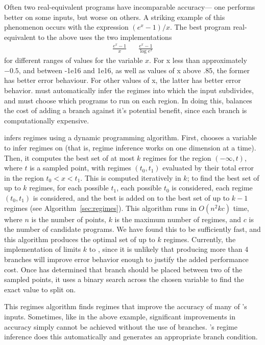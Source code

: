 \documentclass[paper.tex]{subfiles}
\begin{document}
Often two real-equivalent programs have incomparable accuracy---%
  one performs better on some inputs, but worse on others.
A striking example of this phenomenon occurs with the expression $(e^x - 1) / x$.
The best program real-equivalent to the above
  uses the two implementations
\begin{align*}
  \frac{e^x - 1}{x} && \frac{e^x - 1}{\log e^x}
\end{align*}
  for different ranges of values for the variable $x$.
For x less than approximately $-0.5$, 
  and between -1e16 and 1e16,
  as well as values of x above .85,
  the former has better error behaviour.
For other values of x,
  the latter has better error behavior.
\casio must automatically infer the regimes
  into which the input subdivides,
  and must choose which programs to run on each region.
In doing this, \casio balances the cost of adding a branch
  against it's potential benefit,
  since each branch is computationally expensive.

\casio infers regimes using a dynamic programming algorithm.
First, \casio chooses a variable to infer regimes on
  (that is, regime inference works on one dimension at a time).
Then, it computes the best set of at most $k$ regimes
  for the region $(-\infty, t)$, where $t$ is a sampled point,
  with regimes $(t_0, t_1)$ evaluated by their total error
  in the region $t_0 < x < t_1$.
This is computed iteratively in $k$;
  to find the best set of up to $k$ regimes,
  for each possible $t_1$, each possible $t_0$ is considered,
  each regime $(t_0, t_1)$ is considered,
  and the best is added on to the best set of up to $k-1$ regimes
  (see Algorithm~\ref{sec:regimes}).
This algorithm runs in $O(n^2 k c)$ time,
  where $n$ is the number of points,
  $k$ is the maximum number of regimes,
  and $c$ is the number of candidate programs.
We have found this to be sufficiently fast,
  and this algorithm produces the optimal set of up to $k$ regimes.
Currently, the implementation of \casio limits $k$ to \nRegimes,
  since it is unlikely that producing more than 4 branches
  will improve error behavior enough to justify the added performance cost.
Once \casio has determined that branch should be placed
  between two of the sampled points,
  it uses a binary search across the chosen variable to 
  find the exact value to split on.

This regimes algorithm finds regimes that improve
  the accuracy of many of \casio's inputs.
Sometimes, like in the above example,
  significant improvements in accuracy simply cannot be achieved
  without the use of branches.
\casio's regime inference does this automatically
  and generates an appropriate branch condition.
\end{document}
